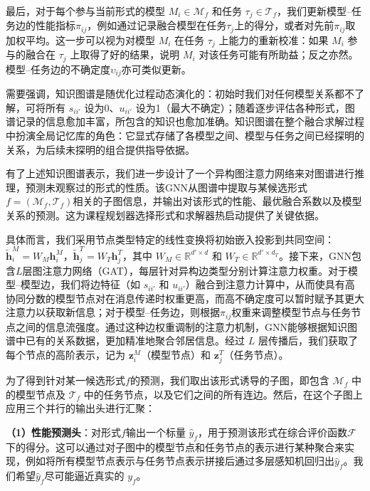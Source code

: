 \documentclass[../main.tex]{subfiles}
\begin{document}
最后，对于每个参与当前形式的模型 $M_i\in \mathcal{M}_f$ 和任务 $\tau_j \in \mathcal{T}_f$，我们更新模型--任务边的性能指标$\pi_{ij}$，例如通过记录融合模型在任务$\tau_j$上的得分，或者对先前$\pi_{ij}$取加权平均。这一步可以视为对模型 $M_i$ 在任务 $\tau_j$ 上能力的重新校准：如果 $M_i$ 参与的融合在 $\tau_j$ 上取得了好的结果，说明 $M_i$ 对该任务可能有所助益；反之亦然。模型--任务边的不确定度$\upsilon_{ij}$亦可类似更新。

需要强调，知识图谱是随优化过程动态演化的：初始时我们对任何模型关系都不了解，可将所有 $s_{ii'}$ 设为0、$u_{ii'}$ 设为1（最大不确定）；随着逐步评估各种形式，图谱记录的信息愈加丰富，所包含的知识也愈加准确。知识图谱在整个融合求解过程中扮演全局记忆库的角色：它显式存储了各模型之间、模型与任务之间已经探明的关系，为后续未探明的组合提供指导依据。

\label{sec:ch5-4-2-gnn-relational-reasoning}

有了上述知识图谱表示，我们进一步设计了一个异构图注意力网络来对图谱进行推理，预测未观察过的形式的性质。该GNN从图谱中提取与某候选形式$f=(\mathcal{M}_f,\mathcal{T}_f)$相关的子图信息，并输出对该形式的性能、最优融合系数以及模型关系的预测。这为课程规划器选择形式和求解器热启动提供了关键依据。

具体而言，我们采用节点类型特定的线性变换将初始嵌入投影到共同空间：$\tilde{\mathbf{h}}^{M}_i = W_M \mathbf{h}^{M}_i$，$\tilde{\mathbf{h}}^{T}_j = W_T \mathbf{h}^{T}_j$，其中 $W_M \in \mathbb{R}^{d'\times d}$ 和 $W_T \in \mathbb{R}^{d'\times d_T}$。接下来，GNN包含$L$层图注意力网络（GAT）\cite{velickovic2018graph}，每层针对异构边类型分别计算注意力权重。对于模型--模型边，我们将边特征（如 $s_{ii'}$ 和 $u_{ii'}$）融合到注意力计算中，从而使具有高协同分数的模型节点对在消息传递时权重更高，而高不确定度可以暂时赋予其更大注意力以获取新信息；对于模型--任务边，则根据$\pi_{ij}$权重来调整模型节点与任务节点之间的信息流强度。通过这种边权重调制的注意力机制，GNN能够根据知识图谱中已有的关系数据，更加精准地聚合邻居信息。经过 $L$ 层传播后，我们获取了每个节点的高阶表示，记为 $\mathbf{z}^M_i$（模型节点）和 $\mathbf{z}^T_j$（任务节点）。

为了得到针对某一候选形式$f$的预测，我们取出该形式诱导的子图，即包含 $\mathcal{M}_f$ 中的模型节点及 $\mathcal{T}_f$ 中的任务节点，以及它们之间的所有连边。然后，在这个子图上应用三个并行的输出头进行汇聚：

\textbf{（1）性能预测头}：对形式$f$输出一个标量 $\hat{y}_f$，用于预测该形式在综合评价函数$\mathcal{F}$下的得分。这可以通过对子图中的模型节点和任务节点的表示进行某种聚合来实现，例如将所有模型节点表示与任务节点表示拼接后通过多层感知机回归出$\hat{y}_f$。我们希望$\hat{y}_f$尽可能逼近真实的 $y_f$。
\end{document}
